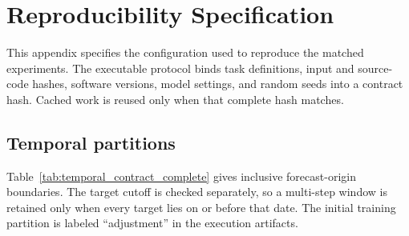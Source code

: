 \section{Reproducibility Specification}
\label{app:hyperparameters}

This appendix specifies the configuration used to reproduce the matched
experiments.
The executable protocol binds task definitions, input and source-code hashes,
software versions, model settings, and random seeds into a contract hash.
Cached work is reused only when that complete hash matches.

\subsection{Temporal partitions}

Table~\ref{tab:temporal_contract_complete} gives inclusive forecast-origin
boundaries. The target cutoff is checked separately, so a multi-step window is
retained only when every target lies on or before that date. The initial
training partition is labeled ``adjustment'' in the execution artifacts.

